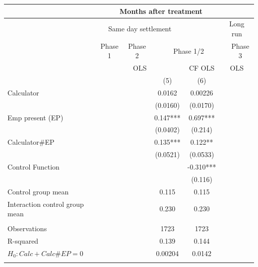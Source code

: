 \begin{tabular}{lcccccccc}
\toprule
\multicolumn{1}{|r}{} & \multicolumn{7}{c}{Months after treatment}            &  \\
\midrule
\multicolumn{1}{r|}{} & \multicolumn{5}{c}{Same day settlement} & \multicolumn{1}{c|}{} & \multicolumn{2}{c}{Long run} \\
\midrule
\midrule
\multicolumn{1}{r|}{} & \multicolumn{2}{c|}{Phase 1} & \multicolumn{2}{c|}{Phase 2} & \multicolumn{3}{c|}{Phase 1/2} & Phase 3 \\
\midrule
\multicolumn{1}{r|}{} & \multicolumn{5}{c|}{OLS}              & \multicolumn{1}{c|}{CF OLS} & \multicolumn{2}{c}{OLS} \\
\midrule
\midrule
      &       &       &       &       & (5)   & (6)   &       &  \\
Calculator  &       &       &       &       & 0.0162 & 0.00226 &       &  \\
      &       &       &       &       & (0.0160) & (0.0170) &       &  \\
Emp present (EP) &       &       &       &       & 0.147*** & 0.697*** &       &  \\
      &       &       &       &       & (0.0402) & (0.214) &       &  \\
Calculator\#EP &       &       &       &       & 0.135*** & 0.122** &       &  \\
      &       &       &       &       & (0.0521) & (0.0533) &       &  \\
Control Function &       &       &       &       &       & -0.310*** &       &  \\
      &       &       &       &       &       & (0.116) &       &  \\
\midrule
Control group mean &       &       &       &       & 0.115 & 0.115 &       &  \\
Interaction control group mean &       &       &       &       & 0.230 & 0.230 &       &  \\
\midrule
      &       &       &       &       &       &       &       &  \\
\midrule
Observations &       &       &       &       & 1723  & 1723  &       &  \\
R-squared &       &       &       &       & 0.139 & 0.144 &       &  \\
$H_0 : Calc + Calc\# EP = 0$ &       &       &       &       & 0.00204 & 0.0142 &       &  \\
\midrule
\midrule
      &       &       &       &       &       &       &       &  \\
\midrule
\midrule
\end{tabular}%
